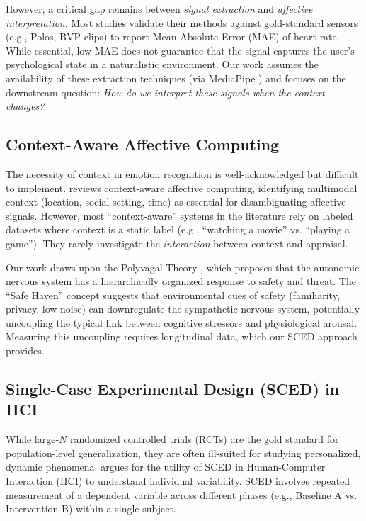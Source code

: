 \documentclass[journal]{IEEEtran}
\begin{document}
However, a critical gap remains between \textit{signal extraction} and \textit{affective interpretation}. Most studies validate their methods against gold-standard sensors (e.g., Polos, BVP clips) to report Mean Absolute Error (MAE) of heart rate. While essential, low MAE does not guarantee that the signal captures the user's psychological state in a naturalistic environment. Our work assumes the availability of these extraction techniques (via MediaPipe \cite{mediapipe}) and focuses on the downstream question: \textit{How do we interpret these signals when the context changes?}

\subsection{Context-Aware Affective Computing}
The necessity of context in emotion recognition is well-acknowledged but difficult to implement. \cite{context_aware_ac} reviews context-aware affective computing, identifying multimodal context (location, social setting, time) as essential for disambiguating affective signals. However, most ``context-aware'' systems in the literature rely on labeled datasets where context is a static label (e.g., ``watching a movie'' vs. ``playing a game''). They rarely investigate the \textit{interaction} between context and appraisal.

Our work draws upon the Polyvagal Theory \cite{polyvagal, porges_safe_haven}, which proposes that the autonomic nervous system has a hierarchically organized response to safety and threat. The ``Safe Haven'' concept suggests that environmental cues of safety (familiarity, privacy, low noise) can downregulate the sympathetic nervous system, potentially uncoupling the typical link between cognitive stressors and physiological arousal. Measuring this uncoupling requires longitudinal data, which our SCED approach provides.

\subsection{Single-Case Experimental Design (SCED) in HCI}
While large-$N$ randomized controlled trials (RCTs) are the gold standard for population-level generalization, they are often ill-suited for studying personalized, dynamic phenomena. \cite{kazemitabar_sced_hci} argues for the utility of SCED in Human-Computer Interaction (HCI) to understand individual variability. SCED involves repeated measurement of a dependent variable across different phases (e.g., Baseline A vs. Intervention B) within a single subject.
\end{document}
